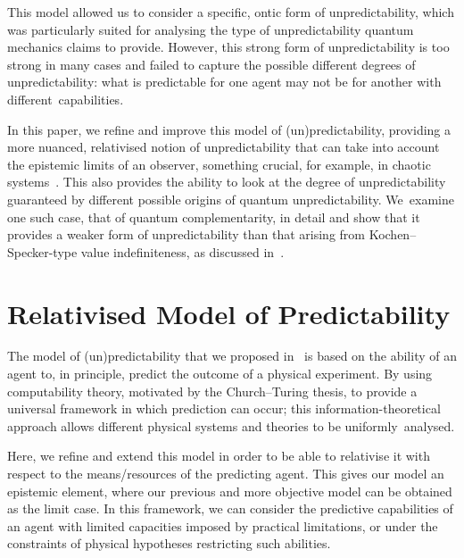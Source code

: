 \documentclass[information,article,accept,moreauthors,pdftex,12pt,a4paper]{mdpi}
\theoremstyle{mdpi}
\newcounter{ex}
\newcounter{re}
\theoremstyle{mdpidefinition}
\begin{document}


This model allowed us to consider a specific, ontic form of unpredictability, which was particularly suited for analysing the type of unpredictability quantum mechanics claims to provide.
However, this strong form of unpredictability is too strong in many cases and failed to capture the possible different degrees of unpredictability: what is predictable for one agent may not be for another with \mbox{different capabilities.}

In this paper, we refine and improve this model of (un)predictability, providing a more nuanced, relativised notion of unpredictability that can take into account the epistemic limits of an observer, something crucial, for example, in chaotic systems~\cite{Werndl:2009nx}.
This also provides the ability to look at the degree of unpredictability guaranteed by different possible origins of quantum unpredictability.
\mbox{We examine} one such case, that of quantum complementarity, in detail and show that it provides a weaker form of unpredictability than that arising from Kochen--Specker-type value indefiniteness, as discussed in~\cite{DBLP:conf/birthday/AbbottCS15}.


\vspace{24pt}

\section{Relativised Model of Predictability}

The model of (un)predictability that we proposed in~\cite{DBLP:conf/birthday/AbbottCS15} is based on the ability of an agent to, in principle, predict the outcome of a physical experiment.
By using computability theory, motivated by the Church--Turing thesis, to provide a universal framework in which prediction can occur; this \mbox{information-theoretical} approach allows different physical systems and theories to be \mbox{uniformly analysed.}

Here, we refine and extend this model in order to be able to relativise it with respect to the means/resources of the predicting agent.
This gives our model an epistemic element, where our previous and more objective model can be obtained as the limit case.
In this framework, we can consider the predictive capabilities of an agent with limited capacities imposed by practical limitations, or under the constraints of physical hypotheses restricting such abilities.
\end{document}
